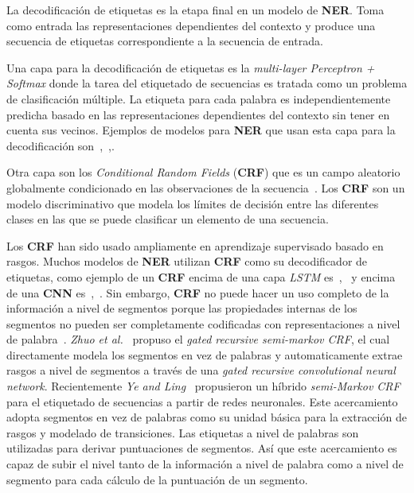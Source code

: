 La decodificaci\'on de etiquetas es la etapa final en un modelo de \textbf{NER}. Toma como entrada las representaciones dependientes del contexto y produce una secuencia de etiquetas correspondiente a la secuencia de entrada.

Una capa para la decodificaci\'on de etiquetas es la \emph{multi-layer Perceptron + Softmax} donde la tarea del etiquetado de secuencias es tratada como un problema de clasificaci\'on m\'ultiple. La etiqueta para cada palabra es independientemente predicha basado en las representaciones dependientes del contexto sin tener en cuenta sus vecinos. Ejemplos de modelos para \textbf{NER} que usan esta capa para la decodificaci\'on son~\cite{strubell2017fast},~\cite{li2017leveraging},\cite{xu2017local}.

Otra capa son los \emph{Conditional Random Fields} (\textbf{CRF}) que es un campo aleatorio globalmente condicionado en las observaciones de la secuencia~\cite{lafferty2001conditional}. Los \textbf{CRF} son un modelo discriminativo que modela los l\'imites de decisi\'on entre las diferentes clases en las que se puede clasificar un elemento de una secuencia.

Los \textbf{CRF} han sido usado ampliamente en aprendizaje supervisado basado en rasgos. Muchos modelos de \textbf{NER} utilizan \textbf{CRF} como su decodificador de etiquetas, como ejemplo de un \textbf{CRF} encima de una capa \emph{LSTM} es~\cite{huang2015bidirectional},~\cite{peters2018deep} y encima de una \textbf{CNN} es~\cite{collobert2011natural},~\cite{yao2015biomedical}. Sin embargo, \textbf{CRF} no puede hacer un uso completo de la informaci\'on a nivel de segmentos porque las propiedades internas de los segmentos no pueden ser completamente codificadas con representaciones a nivel de palabra~\cite{li2018survey}. \emph{Zhuo et al.}~\cite{zhuo2016segment} propuso el \emph{gated recursive semi-markov CRF}, el cual directamente modela los segmentos en vez de palabras y automaticamente extrae rasgos a nivel de segmentos a trav\'es de una \emph{gated recursive convolutional neural network}. Recientemente \emph{Ye and Ling}~\cite{ye2018hybrid} propusieron un h\'ibrido \emph{semi-Markov CRF} para el etiquetado de secuencias a partir de redes neuronales. Este acercamiento adopta segmentos en vez de palabras como su unidad b\'asica para la extracci\'on de rasgos y modelado de transiciones. Las etiquetas a nivel de palabras son utilizadas para derivar puntuaciones de segmentos. As\'i que este acercamiento es capaz de subir el nivel tanto de la informaci\'on a nivel de palabra como a nivel de segmento para cada c\'alculo de la puntuaci\'on de un segmento.

